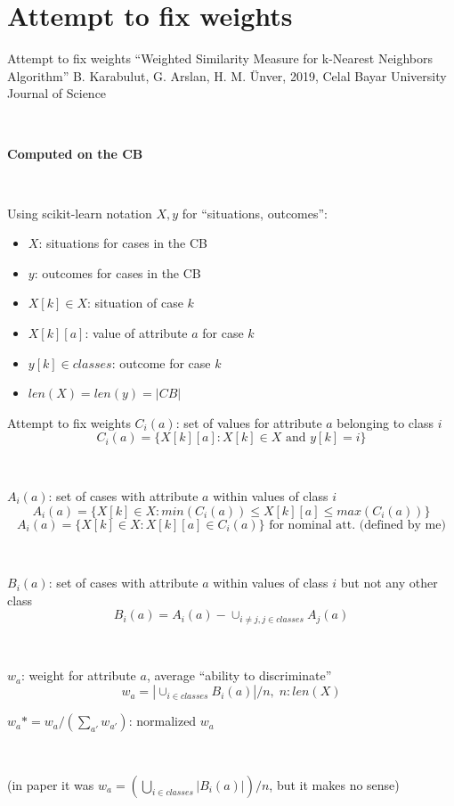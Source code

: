 \documentclass[]{beamer}
\begin{document}
\section{Attempt to fix weights}
\begin{frame}{Attempt to fix weights}
    ``Weighted Similarity Measure for k-Nearest Neighbors Algorithm''
    B. Karabulut, G. Arslan, H. M. Ünver, 2019, Celal Bayar University Journal of Science

    ~

    \textbf{Computed on the CB}

    ~

    Using scikit-learn notation $X, y$ for ``situations, outcomes'':
    \begin{itemize}
        \item 
        $X$: situations for cases in the CB
        \item 
        $y$: outcomes for cases in the CB
        \item 
        $X[k] \in X$: situation of case $k$
        \item 
        $X[k][a]$: value of attribute $a$ for case $k$
        \item 
        $y[k] \in classes$: outcome for case $k$
        \item 
        $len(X) = len(y) = |CB|$
    \end{itemize}
\end{frame}
\begin{frame}{Attempt to fix weights}
    \smaller
    $C_i(a)$: set of values for attribute $a$ belonging to class $i$
    $$C_i(a) = \{X[k][a]: X[k] \in X \text{ and }y[k]=i\}$$
    
~

    $A_i(a)$: set of cases with attribute $a$ within values of class $i$
    $$A_i(a) = \{X[k] \in X: min(C_i(a)) \leq X[k][a] \leq max(C_i(a))\}$$
    $$A_i(a) = \{X[k] \in X: X[k][a] \in C_i(a)\} \text{ for nominal att. (defined by me)}$$
    
~

    $B_i(a)$: set of cases with attribute $a$ within values of class $i$ but not any other class
    $$B_i(a) = A_i(a) - \cup_{i\ne j, j\in classes} A_j(a)$$
    
~

    $w_a$: weight for attribute $a$, average ``ability to discriminate''
    $$w_a=|\cup_{i\in classes} B_i(a)| / n, \; n: len(X)$$ 
    
    $w_a*=w_a/(\sum_{a'} w_{a'})$: normalized $w_a$

    ~

    {\smaller\smaller(in paper it was $w_a=(\bigcup_{i\in classes} |B_i(a)|) / n$, but it makes no sense)}

\end{frame}
\end{document}
